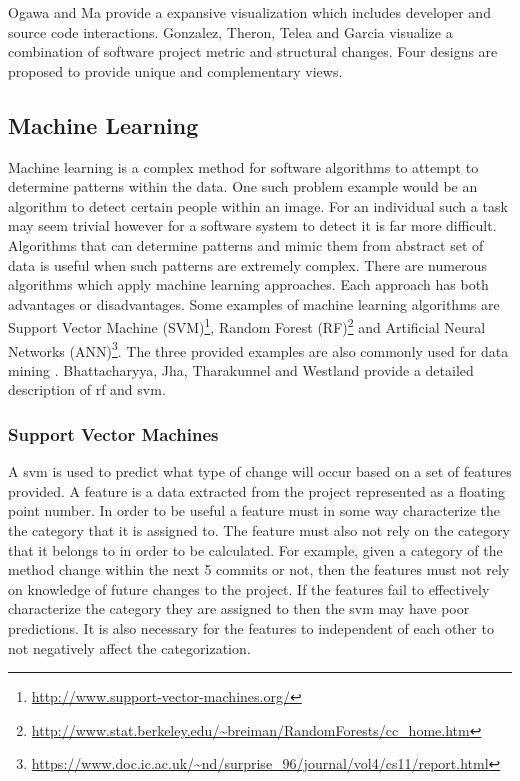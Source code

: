 Ogawa and Ma provide a expansive visualization which includes developer and source code interactions\cite{Ma2008}. Gonzalez, Theron, Telea and Garcia visualize a combination of software project metric and structural changes. Four designs are proposed to provide unique and complementary views.

\subsection{Machine Learning}

Machine learning is a complex method for software algorithms to attempt to determine patterns within the data. %
One such problem example would be an algorithm to detect certain people within an image. For an individual such a task may seem trivial however for a software system to detect it is far more difficult. Algorithms that can determine patterns and mimic them from abstract set of data is useful when such patterns are extremely complex. There are numerous algorithms which apply machine learning approaches. Each approach has both advantages or disadvantages. Some examples of machine learning algorithms are Support Vector Machine (SVM)\footnote{\url{http://www.support-vector-machines.org/}}, Random Forest (RF)\footnote{\url{http://www.stat.berkeley.edu/~breiman/RandomForests/cc_home.htm}} and Artificial Neural Networks (ANN)\footnote{\url{https://www.doc.ic.ac.uk/~nd/surprise_96/journal/vol4/cs11/report.html}}. The three provided examples are also commonly used for data mining \cite{Alam2013, Westland2011, Granitto2007, Huang2007, Jalbert2012, Yu2011}. Bhattacharyya, Jha, Tharakunnel and Westland provide a detailed description of \gls{rf} and \gls{svm}\cite{Westland2011}.

\subsubsection{Support Vector Machines}
\label{subsec:svm_prediction}

A \gls{svm} is used to predict what type of change will occur based on a set of features provided. A feature is a data extracted from the project represented as a floating point number. In order to be useful a feature must in some way characterize the the category that it is assigned to. The feature must also not rely on the category that it belongs to in order to be calculated. For example, given a category of the method change within the next 5 commits or not, then the features must not rely on knowledge of future changes to the project. If the features fail to effectively characterize the category they are assigned to then the \gls{svm} may have poor predictions. It is also necessary for the features to independent of each other to not negatively affect the categorization.

